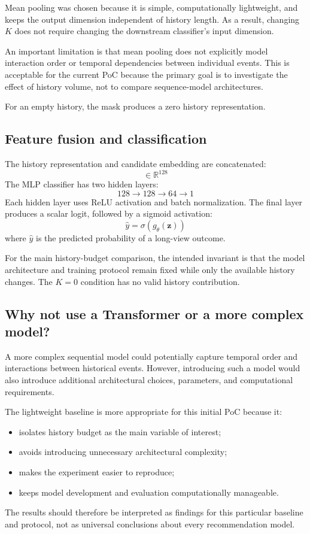 \documentclass[11pt,a4paper]{article}
\begin{document}
Mean pooling was chosen because it is simple, computationally lightweight, and keeps the output dimension independent of history length. As a result, changing $K$ does not require changing the downstream classifier's input dimension.

An important limitation is that mean pooling does not explicitly model interaction order or temporal dependencies between individual events. This is acceptable for the current PoC because the primary goal is to investigate the effect of history volume, not to compare sequence-model architectures.

For an empty history, the mask produces a zero history representation.

\subsection{Feature fusion and classification}
The history representation and candidate embedding are concatenated:
\begin{equation}
[\mathbf{h}_t^{(K)}; \mathbf{v}] \in \mathbb{R}^{128}
\end{equation}
The MLP classifier has two hidden layers:
\begin{equation}
128 \rightarrow 128 \rightarrow 64 \rightarrow 1
\end{equation}
Each hidden layer uses ReLU activation and batch normalization. The final layer produces a scalar logit, followed by a sigmoid activation:
\begin{equation}
\hat{y} = \sigma(g_\theta(\mathbf{z}))
\end{equation}
where $\hat{y}$ is the predicted probability of a long-view outcome.

For the main history-budget comparison, the intended invariant is that the model architecture and training protocol remain fixed while only the available history changes. The $K=0$ condition has no valid history contribution.

\subsection{Why not use a Transformer or a more complex model?}
A more complex sequential model could potentially capture temporal order and interactions between historical events. However, introducing such a model would also introduce additional architectural choices, parameters, and computational requirements.

The lightweight baseline is more appropriate for this initial PoC because it:
\begin{itemize}
    \item isolates history budget as the main variable of interest;
    \item avoids introducing unnecessary architectural complexity;
    \item makes the experiment easier to reproduce;
    \item keeps model development and evaluation computationally manageable.
\end{itemize}
The results should therefore be interpreted as findings for this particular baseline and protocol, not as universal conclusions about every recommendation model.
\end{document}

